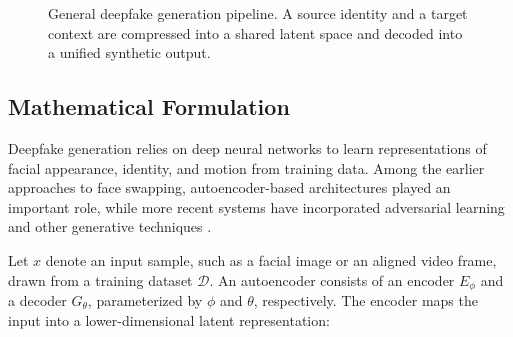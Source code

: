 \documentclass[a4paper,12pt]{article}
\begin{document}
\begin{figure}[H]
    \centering
    \caption{General deepfake generation pipeline. A source identity and a target context are compressed into a shared latent space and decoded into a unified synthetic output.}
    \label{fig:gen-architecture}
\end{figure}

\subsection{Mathematical Formulation}
\label{subsec:gen-math}

Deepfake generation relies on deep neural networks to learn representations of facial appearance, identity, and motion from training data. Among the earlier approaches to face swapping, autoencoder-based architectures played an important role, while more recent systems have incorporated adversarial learning and other generative techniques \cite{tolosana2020deepfakes,perov2020deepfacelab,pei2024deepfake}.

Let $x$ denote an input sample, such as a facial image or an aligned video frame, drawn from a training dataset $\mathcal{D}$. An autoencoder consists of an encoder $E_{\phi}$ and a decoder $G_{\theta}$, parameterized by $\phi$ and $\theta$, respectively. The encoder maps the input into a lower-dimensional latent representation:
\end{document}
